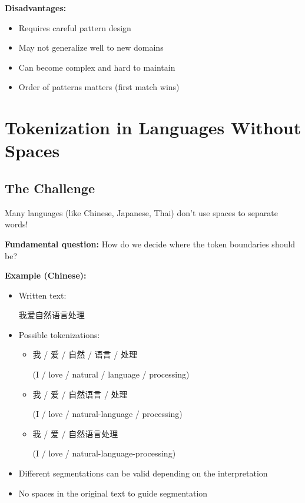 \documentclass[11pt,a4paper]{article}
\theoremstyle{definition}
\theoremstyle{plain}
\theoremstyle{remark}
\begin{document}
\textbf{Disadvantages:}
\begin{itemize}
    \item Requires careful pattern design
    \item May not generalize well to new domains
    \item Can become complex and hard to maintain
    \item Order of patterns matters (first match wins)
\end{itemize}

\section{Tokenization in Languages Without Spaces}

\subsection{The Challenge}

Many languages (like Chinese, Japanese, Thai) don't use spaces to separate words!

\textbf{Fundamental question:} How do we decide where the token boundaries should be?

\textbf{Example (Chinese):}
\begin{itemize}
    \item Written text: \begin{CJK}{UTF8}{gbsn}我爱自然语言处理\end{CJK}
    \item Possible tokenizations:
    \begin{itemize}
        \item \begin{CJK}{UTF8}{gbsn}我 / 爱 / 自然 / 语言 / 处理\end{CJK} (I / love / natural / language / processing)
        \item \begin{CJK}{UTF8}{gbsn}我 / 爱 / 自然语言 / 处理\end{CJK} (I / love / natural-language / processing)
        \item \begin{CJK}{UTF8}{gbsn}我 / 爱 / 自然语言处理\end{CJK} (I / love / natural-language-processing)
    \end{itemize}
    \item Different segmentations can be valid depending on the interpretation
    \item No spaces in the original text to guide segmentation
\end{itemize}
\end{document}
